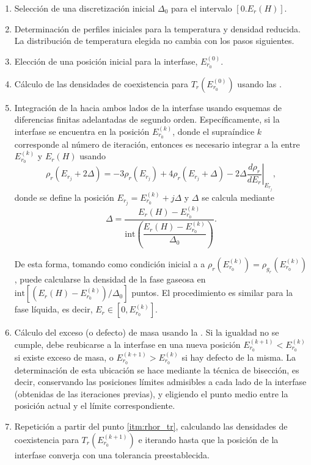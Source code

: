\begin{enumerate}

\item Selecci\'on de una discretizaci\'on inicial $\Delta_0$ para el intervalo $[0.E_r(H)]$.

\item Determinaci\'on de perfiles iniciales para la temperatura y densidad reducida. La distribuci\'on de temperatura elegida no cambia con los pasos siguientes.

\item Elecci\'on de una posici\'on inicial para la interfase, $E_{r_0}^{(0)}$.

\item \label{itm:rhor_tr} C\'alculo de las densidades de coexistencia para $T_r(E_{r_0}^{(0)})$ usando las .

\item Integraci\'on de la  hacia ambos lados de la interfase usando esquemas de diferencias finitas adelantadas de segundo orden. Espec\'ificamente, si la interfase se encuentra en la posici\'on $E_{r_0}^{(k)}$, donde el supra\'indice $k$ corresponde al n\'umero de iteraci\'on, entonces es necesario integrar a la  entre $E_{r_0}^{(k)}$ y $E_r(H)$ usando
\begin{equation}
	\rho_r(E_{r_j} + 2\Delta) = -3\rho_r(E_{r_j}) + 4\rho_r(E_{r_j} + \Delta) - 2\Delta \left.\dfrac{d \rho_r}{d E_r} \right|_{E_{r_j}},
\end{equation}
donde se define la posici\'on $E_{r_j} = E_{r_0}^{(k)} + j\Delta$ y $\Delta$ se calcula mediante
\begin{equation}
	\Delta = \dfrac{E_r(H) - E_{r_0}^{(k)}}{\mbox{int} \left( \dfrac{E_r(H) - E_{r_0}^{(k)}}{\Delta_0} \right)}.
\end{equation}

De esta forma, tomando como condici\'on inicial a a $\rho_r(E_{r_0}^{(k)}) = \rho_{g_r}(E_{r_0}^{(k)})$, puede calcularse la densidad de la fase gaseosa en $\mbox{int}[ (E_r(H) - E_{r_0}^{(k)} )/\Delta_0 ]$ puntos. El procedimiento es similar para la fase l\'iquida, es decir, $E_r \in [0,E_{r_0}^{(k)}]$.

\item C\'alculo del exceso (o defecto) de masa usando la . Si la igualdad no se cumple, debe reubicarse a la interfase en una nueva posici\'on $E_{r_0}^{(k+1)} < E_{r_0}^{(k)}$ si existe exceso de masa, o $E_{r_0}^{(k+1)} > E_{r_0}^{(k)}$ si hay defecto de la misma. La determinaci\'on de esta ubicaci\'on se hace mediante la t\'ecnica de bisecci\'on, es decir, conservando las posiciones l\'imites admisibles a cada lado de la interfase (obtenidas de las iteraciones previas), y eligiendo el punto medio entre la posici\'on actual y el l\'imite correspondiente.

\item Repetici\'on a partir del punto \ref{itm:rhor_tr}, calculando las densidades de coexistencia para $T_r(E_{r_0}^{(k+1)})$ e iterando hasta que la posici\'on de la interfase converja con una tolerancia preestablecida.

\end{enumerate}


